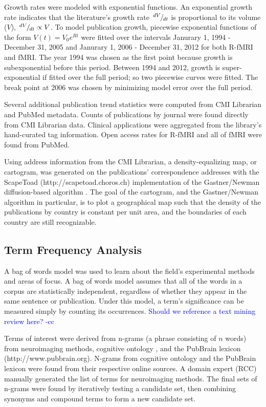 \documentclass[12pt,3p,review,number]{elsarticle}
\def\slantfrac#1#2{\kern.1em^{#1}\kern-.1em/\kern-.1em_{#2}}
\begin{document}
Growth rates were modeled with exponential functions. An exponential growth rate
indicates that the literature’s growth rate $\slantfrac{dV}{dt}$ is proportional
to its volume ($V$), $\slantfrac{dV}{dt} \propto V$.  To model publication
growth, piecewise exponential functions of the form $V(t)=V_0 e^{Rt}$ were
fitted over the intervals Janurary 1, 1994 - December 31, 2005 and 
Janurary 1, 2006 - December 31, 2012 for
both R-fMRI and fMRI. The year 1994 was chosen as the first point because growth
is subexponential before this period. Between 1994 and 2012, growth is
super-exponential if fitted over the full period; so two piecewise curves were
fitted. The break point at 2006 was chosen by minimizing model error over the
full period. 

Several additional publication trend statistics were computed from CMI Librarian
and PubMed metadata. Counts of publications by journal were found directly from
CMI Librarian data. Clinical applications were aggregated from the library’s
hand-curated tag information. Open access rates for R-fMRI and all of
fMRI were found from PubMed. 

Using address information from the CMI Librarian, a density-equalizing map, or
cartogram, was generated on the publications’ correspondence addresses with the
ScapeToad (http://scapetoad.choros.ch) implementation of the Gastner/Newman
diffusion-based algorithm \cite{Gastner2004}.  The goal of the cartogram, and
the Gastner/Newman algorithm in particular, is to plot a geographical map such
that the density of the publications by country is constant per unit area, and
the boundaries of each country are still recognizable.

\subsection{Term Frequency Analysis}
A bag of words model was used to learn about the field’s experimental methods
and areas of focus. A bag of words model assumes that all of the words in a
corpus are statistically independent, regardless of whether they appear in the
same sentence or publication.  Under this model, a term’s significance can be
measured simply by counting its occurrences. \textcolor{blue}{Should we reference
a text mining review here? -cc}

Terms of interest were derived from n-grams (a phrase consisting of $n$ words)
from neuroimaging methods, cognitive ontology \cite{Poldrack2011}, and the
PubBrain lexicon (http://www.pubbrain.org). N-grams from cognitive ontology and
the PubBrain lexicon were found from their respective online sources. A domain
expert (RCC) manually generated the list of terms for neuroimaging methods. The
final sets of n-grams were found by iteratively testing a candidate set, then
combining synonyms and compound terms to form a new candidate set.
\end{document}
